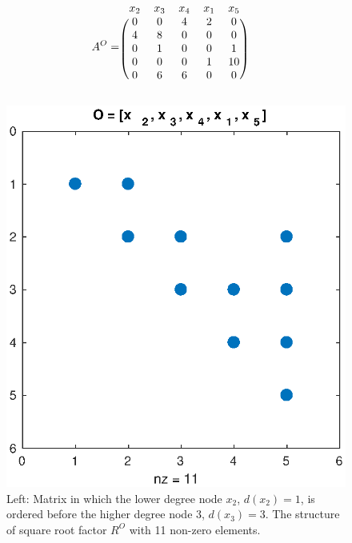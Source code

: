 \begin{figure}[H]
\begin{minipage}{0.5\textwidth}
\centering
\[ 
A^O = 
\begin{blockarray}{cccccc}
x_2 & x_3 & x_4 & x_1 & x_5 & \\
\begin{block}{(ccccc)c}
0   &   0     & 4     & 2     & 0 & \\
4   &   8     & 0     & 0     & 0 & \\
0   &   1     & 0     & 0     & 1 & \\
0   &   0     & 0     & 1    & 10 & \\
0   &   6     & 6     & 0     & 0 & \\
\end{block}
\end{blockarray}
\]
\end{minipage}
\begin{minipage}{0.5\textwidth}
\centering
\includegraphics[width=\textwidth]{Chapters/figures2/sample_R_good}
\end{minipage}
\caption{Left: Matrix in which the lower degree node $x_2$, $d(x_2)=1$, is ordered before the higher degree node 3, $d(x_3)=3$. The structure of square root factor $R^O$ with 11 non-zero elements.}
\label{fig:good_ordering}
\end{figure}
